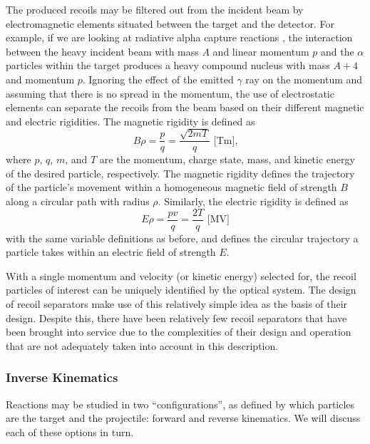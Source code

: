 The produced recoils may be filtered out from the incident beam by
electromagnetic elements situated between the target and the detector.
For example, if we are looking at radiative alpha capture reactions
, the interaction between the heavy incident
beam with mass $A$ and linear momentum $p$ and the $\alpha$ particles
within the target produces a heavy compound nucleus with mass $A + 4$
and momentum $p$. Ignoring the effect of the emitted $\gamma$ ray on the
momentum and assuming that there is no spread in the momentum, the use
of electrostatic elements can separate the recoils from the beam based
on their different magnetic and electric rigidities. The magnetic
rigidity is defined as
\begin{equation}
    \label{eq:brho}
    B\rho = \frac{p}{q} = \frac{\sqrt{2mT}}{q}\textrm{ [Tm],}
\end{equation}
where $p$, $q$, $m$, and $T$ are the momentum, charge state, mass, and
kinetic energy of the desired particle, respectively. The magnetic
rigidity defines the trajectory of the particle's movement within a
homogeneous magnetic field of strength $B$ along a circular path with
radius $\rho$. Similarly, the electric rigidity is defined as
\begin{equation}
    \label{eq:erho}
    E\rho = \frac{pv}{q} = \frac{2T}{q}\textrm{ [MV]}
\end{equation}
with the same variable definitions as before, and defines the circular
trajectory a particle takes within an electric field of strength $E$.

With a single momentum and velocity (or kinetic energy) selected for,
the recoil particles of interest can be uniquely identified by the
optical system. The design of recoil separators make use of this
relatively simple idea as the basis of their design. Despite this, there
have been relatively few recoil separators that have been brought into
service due to the complexities of their design and operation that are
not adequately taken into account in this description.

\subsubsection{Inverse Kinematics}
Reactions may be studied in two ``configurations'', as defined by which
particles are the target and the projectile: forward and reverse
kinematics. We will discuss each of these options in turn.

